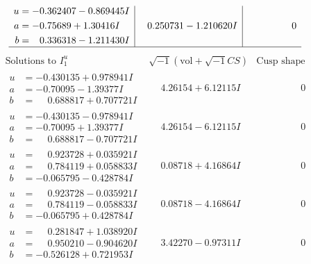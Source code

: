 \documentclass[1p]{elsarticle_modified}
\theoremstyle{definition}
\newcommand{\I}{\sqrt{-1}}
\begin{document}
$$\begin{array}{c|c|c}
\begin{aligned}
u &= -0.362407 - 0.869445 I \\
a &= -0.75689 + 1.30416 I \\
b &= \phantom{-}0.336318 - 1.211430 I\end{aligned}
 & \phantom{-}0.250731 - 1.210620 I & \phantom{-0.000000 } 0\\
 \hline 
 \end{array}$$\newpage$$\begin{array}{c|c|c}  
\text{Solutions to }I^u_{1}& \I (\text{vol} + \sqrt{-1}CS) & \text{Cusp shape}\\
 \hline 
\begin{aligned}
u &= -0.430135 + 0.978941 I \\
a &= -0.70095 - 1.39377 I \\
b &= \phantom{-}0.688817 + 0.707721 I\end{aligned}
 & \phantom{-}4.26154 + 6.12115 I & \phantom{-0.000000 } 0 \\ \hline\begin{aligned}
u &= -0.430135 - 0.978941 I \\
a &= -0.70095 + 1.39377 I \\
b &= \phantom{-}0.688817 - 0.707721 I\end{aligned}
 & \phantom{-}4.26154 - 6.12115 I & \phantom{-0.000000 } 0 \\ \hline\begin{aligned}
u &= \phantom{-}0.923728 + 0.035921 I \\
a &= \phantom{-}0.784119 + 0.058833 I \\
b &= -0.065795 - 0.428784 I\end{aligned}
 & \phantom{-}0.08718 + 4.16864 I & \phantom{-0.000000 } 0 \\ \hline\begin{aligned}
u &= \phantom{-}0.923728 - 0.035921 I \\
a &= \phantom{-}0.784119 - 0.058833 I \\
b &= -0.065795 + 0.428784 I\end{aligned}
 & \phantom{-}0.08718 - 4.16864 I & \phantom{-0.000000 } 0 \\ \hline\begin{aligned}
u &= \phantom{-}0.281847 + 1.038920 I \\
a &= \phantom{-}0.950210 - 0.904620 I \\
b &= -0.526128 + 0.721953 I\end{aligned}
 & \phantom{-}3.42270 - 0.97311 I & \phantom{-0.000000 } 0 \\ \hline\begin{aligned}

\end{aligned}
\end{array}$$
\end{document}
